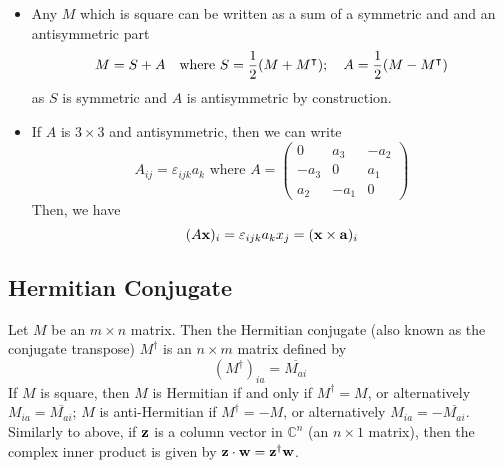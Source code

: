 \documentclass{article}
\begin{document}
\begin{itemize}
\begin{itemize}
          \end{itemize}
    \item Any $M$ which is square can be written as a sum of a symmetric and and an antisymmetric part
          \[ M = S + A\quad\text{where } S = \frac{1}{2}(M + M^\intercal);\quad A = \frac{1}{2}(M - M^\intercal) \]
          as $S$ is symmetric and $A$ is antisymmetric by construction.
    \item If $A$ is $3 \times 3$ and antisymmetric, then we can write
          \[ A_{ij} = \varepsilon_{ijk}a_k\text{ where } A = \begin{pmatrix}
                  0    & a_3  & -a_2 \\
                  -a_3 & 0    & a_1  \\
                  a_2  & -a_1 & 0
              \end{pmatrix} \]
          Then, we have
          \[
              (A \vb x)_i = \varepsilon_{ijk}a_k x_j = (\vb x \times \vb a)_i
          \]
\end{itemize}

\subsection{Hermitian Conjugate}
Let $M$ be an $m \times n$ matrix. Then the Hermitian conjugate (also known as the conjugate transpose) $M^\dagger$ is an $n \times m$ matrix defined by
\[
    (M^\dagger)_{ia} = \overline{M_{ai}}
\]
If $M$ is square, then $M$ is Hermitian if and only if $M^\dagger = M$, or alternatively $M_{ia} = \overline{M_{ai}}$; $M$ is anti-Hermitian if $M^\dagger = -M$, or alternatively $M_{ia} = -\overline{M_{ai}}$. Similarly to above, if $\vb z$ is a column vector in $\mathbb C^n$ (an $n \times 1$ matrix), then the complex inner product is given by $\vb z \cdot \vb w = \vb z^\dagger \vb w$.
\end{document}
